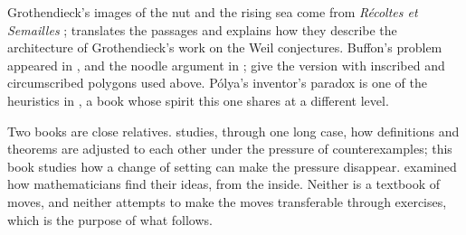 \begin{refsection}
\notesandrefs

Grothendieck's images of the nut and the rising sea come from \emph{R\'ecoltes et Semailles} \parencite{Grothendieck2022}; \textcite{McLarty2007} translates the passages and explains how they describe the architecture of Grothendieck's work on the Weil conjectures. Buffon's problem appeared in \textcite{Buffon1777}, and the noodle argument in \textcite{Barbier1860}; \textcite{AignerZiegler2018} give the version with inscribed and circumscribed polygons used above. P\'olya's inventor's paradox is one of the heuristics in \textcite{Polya1945}, a book whose spirit this one shares at a different level.

Two books are close relatives. \textcite{Lakatos1976} studies, through one long case, how definitions and theorems are adjusted to each other under the pressure of counterexamples; this book studies how a change of setting can make the pressure disappear. \textcite{Hadamard1945} examined how mathematicians find their ideas, from the inside. Neither is a textbook of moves, and neither attempts to make the moves transferable through exercises, which is the purpose of what follows.

\printchapterbib
\end{refsection}
